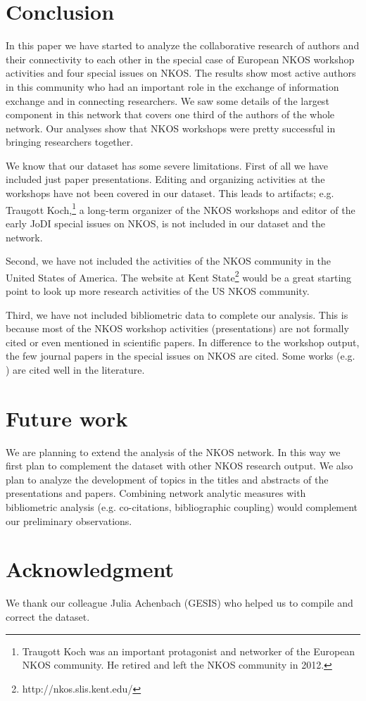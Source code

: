 \documentclass[runningheads,a4paper]{llncs}
\begin{document}
\section{Conclusion}\label{concl}
In this paper we have started to analyze the collaborative research of authors and their connectivity to each other in the special case of European NKOS workshop activities and four special issues on NKOS. The results show most active authors in this community who had an important role in the exchange of information exchange and in connecting researchers. We saw some details of the largest component in this network that covers one third of the authors of the whole network. Our analyses show that NKOS workshops were pretty successful in bringing researchers together.  


We know that our dataset has some severe limitations. 
First of all we have included just paper presentations. Editing and organizing activities at the workshops have not been covered in our dataset. This leads to artifacts; e.g. Traugott Koch,\footnote{Traugott Koch was an important protagonist and networker of the European NKOS community. He retired and left the NKOS community in 2012.} a long-term organizer of the NKOS workshops and editor of the early JoDI special issues on NKOS, is not included in our dataset and the network. 

Second, we have not included the activities of the NKOS community in the United States of America. The website at Kent State\footnote{http://nkos.slis.kent.edu/} would be a great starting point to look up more research activities of the US NKOS community.

Third, we have not included bibliometric data to complete our analysis. This is because most of the NKOS workshop activities (presentations) are not formally cited or even mentioned in scientific papers. In difference to the workshop output, the few journal papers in the special issues on NKOS are cited. Some works (e.g. \cite{SPCranefield2001,SPDoerr2001,SPTudhope2001,SPSoergel2004,SPTrant2006}) are cited well in the literature. 



\section{Future work}\label{future}
We are planning to extend the analysis of the NKOS network. In this way we first plan to complement the dataset with other NKOS research output. We also plan to analyze the development of topics in the titles and abstracts of the presentations and papers. Combining network analytic measures with bibliometric analysis (e.g. co-citations, bibliographic coupling) would complement our preliminary observations.

\section{Acknowledgment}\label{sec:ACKNOWLEDGMENTS}
We thank our colleague Julia Achenbach (GESIS) who helped us to compile and correct the dataset.

\newpage

 
\end{document}
